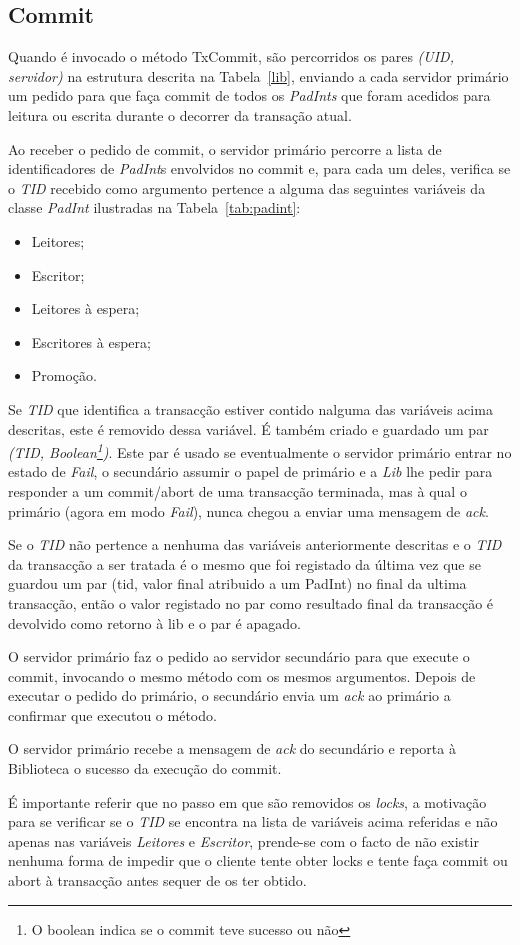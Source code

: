 \subsection{Commit}

Quando é invocado o método TxCommit, são percorridos os pares \textit{(UID, servidor)} na estrutura descrita na Tabela~\ref{lib}, enviando a cada servidor primário um pedido para que faça commit de todos os \textit{PadInts} que foram acedidos para leitura ou escrita durante o decorrer da transação atual.

Ao receber o pedido de commit, o servidor primário percorre a lista de identificadores de \textit{PadInt}s envolvidos no commit e, para cada um deles, verifica se o \textit{TID} recebido como argumento pertence a alguma das seguintes variáveis da classe \textit{PadInt} ilustradas na Tabela~\ref{tab:padint}:
\begin{itemize}
	\item Leitores;
	\item Escritor;
	\item Leitores à espera;
	\item Escritores à espera;
	\item Promoção.
\end{itemize}

Se \textit{TID} que identifica a transacção estiver contido nalguma das variáveis acima descritas, este é removido dessa variável. É também criado e guardado um par \textit{(TID, Boolean\footnote{O boolean indica se o commit teve sucesso ou não})}. Este par é usado se eventualmente o servidor primário entrar no estado de \textit{Fail}, o secundário assumir o papel de primário e a \textit{Lib} lhe pedir para responder a um commit/abort de uma transacção terminada, mas à qual o primário (agora em modo \textit{Fail}), nunca chegou a enviar uma mensagem de \textit{ack}.

Se o \textit{TID} não pertence a nenhuma das variáveis anteriormente descritas e o \textit{TID} da transacção a ser tratada é o mesmo que foi registado da última vez que se guardou um par (tid, valor final atribuido a um PadInt) no final da ultima transacção, então o valor registado no par como resultado final da transacção é devolvido como retorno à lib e o par é apagado.

O servidor primário faz o pedido ao servidor secundário para que execute o commit, invocando o mesmo método com os mesmos argumentos. Depois de executar o pedido do primário, o secundário envia um \textit{ack} ao primário a confirmar que executou o método.

O servidor primário recebe a mensagem de \textit{ack} do secundário e reporta à Biblioteca o sucesso da execução do commit.

É importante referir que no passo em que são removidos os \textit{locks}, a motivação para se verificar se o \textit{TID} se encontra na lista de variáveis acima referidas e não apenas nas variáveis \textit{Leitores} e \textit{Escritor}, prende-se com o facto de não existir nenhuma forma de impedir que o cliente tente obter locks e tente faça commit ou abort à transacção antes sequer de os ter obtido.
